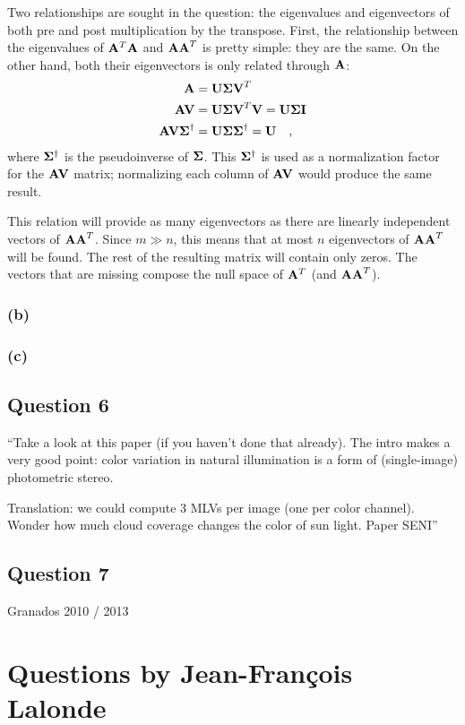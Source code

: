 \documentclass{report}
\begin{document}
Two relationships are sought in the question: the eigenvalues and eigenvectors of both pre and post multiplication by the transpose. First, the relationship between the eigenvalues of $\mathbf{A}^T\mathbf{A}$ and $\mathbf{AA}^T$ is pretty simple: they are the same. On the other hand, both their eigenvectors is only related through $\mathbf{A}$:
\begin{align*}
\mathbf{A}  &= \mathbf{U \Sigma V}^T \\
\mathbf{AV} &= \mathbf{U \Sigma V}^T \mathbf{V} = \mathbf{U \Sigma I} \\
\mathbf{AV\Sigma}^\dagger &= \mathbf{U \Sigma \Sigma}^\dagger = \mathbf{U} \quad,
\end{align*}
where $\mathbf{\Sigma}^\dagger$ is the pseudoinverse of $\mathbf{\Sigma}$. This $\mathbf{\Sigma}^\dagger$ is used as a normalization factor for the $\mathbf{AV}$ matrix; normalizing each column of $\mathbf{AV}$ would produce the same result.

This relation will provide as many eigenvectors as there are linearly independent vectors of $\mathbf{AA}^T$. Since $m \gg n$, this means that at most $n$ eigenvectors of $\mathbf{AA}^T$ will be found. The rest of the resulting matrix will contain only zeros. The vectors that are missing compose the null space of $\mathbf{A}^T$ (and $\mathbf{AA}^T$).

\subsection{(b)}
\subsection{(c)}
\section{Question 6}
``Take a look at this paper (if you haven't done that already). The intro makes a very good point: color variation in natural illumination is a form of (single-image) photometric stereo.

Translation: we could compute 3 MLVs per image (one per color channel). Wonder how much cloud coverage changes the color of sun light.
Paper SENI''
\section{Question 7}

Granados 2010 / 2013

\chapter{Questions by Jean-François Lalonde}
\end{document}
